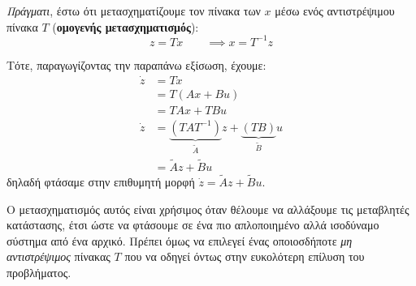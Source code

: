 \documentclass[11pt,a4paper,notitlepage,fleqn]{article}
\begin{document}
\textit{Πράγματι}, έστω ότι μετασχηματίζουμε τον πίνακα των \( x \) μέσω
ενός αντιστρέψιμου πίνακα \( T \) (\textbf{ομογενής μετασχηματισμός}):
\[
z = Tx \qquad \implies x=T^{-1} z
\]

Τότε, παραγωγίζοντας την παραπάνω εξίσωση, έχουμε:
\begin{align*}
	\dot z &= T\dot x \\
	&= T(Ax+Bu) \\
	&= TAx + TBu \\
	\dot z &= \underbrace{(TAT^{-1})}_{\tilde A}z
	+ \underbrace{(TB)}_{\tilde B}u
	\\ &= \tilde A z + \tilde B u
\end{align*}
δηλαδή φτάσαμε στην επιθυμητή μορφή \( \dot z = \tilde A z + \tilde B u \).

Ο μετασχηματισμός αυτός είναι χρήσιμος όταν θέλουμε να αλλάξουμε τις
μεταβλητές κατάστασης, έτσι ώστε να φτάσουμε σε ένα πιο απλοποιημένο
αλλά ισοδύναμο σύστημα από ένα αρχικό. Πρέπει όμως να επιλεγεί ένας
οποιοσδήποτε \textit{μη αντιστρέψιμος} πίνακας \( T \) που να οδηγεί
όντως στην ευκολότερη επίλυση του προβλήματος.
\end{document}
